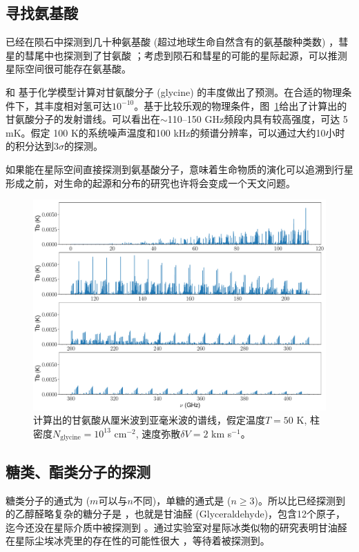 \documentclass{report}
\newcommand{\reffig}[1]{图~\ref{#1}}
\begin{document}
\subsection{寻找氨基酸}
已经在陨石中探测到几十种氨基酸 (超过地球生命自然含有的氨基酸种类数) \citep{Kvenvolden1970,Schmitt2010}，彗星的彗尾中也探测到了甘氨酸 \citep{Altwegg2016}；考虑到陨石和彗星的可能的星际起源，可以推测星际空间很可能存在氨基酸。

\citet{Garrod2013} 和 \citet{Suzuki2018}基于化学模型计算对甘氨酸分子 (glycine) 的丰度做出了预测。在合适的物理条件下，其丰度相对氢可达$10^{-10}$。基于比较乐观的物理条件，\reffig{figGlycine}给出了计算出的甘氨酸分子的发射谱线。可以看出在$\sim$110--150 GHz频段内具有较高强度，可达 5 mK。假定 100 K的系统噪声温度和100 kHz的频谱分辨率，可以通过大约10小时的积分达到$3\sigma$的探测。

如果能在星际空间直接探测到氨基酸分子，意味着生命物质的演化可以追溯到行星形成之前，对生命的起源和分布的研究也许将会变成一个天文问题。

\begin{figure}[htbp]
\centering
\includegraphics[width=0.95\linewidth]{glycine_50K_1e13_10e5_2e5.pdf}
\caption{计算出的甘氨酸从厘米波到亚毫米波的谱线，假定温度$T=50$ K, 柱密度$N_\text{glycine}=10^{13}$ cm$^{-2}$, 速度弥散$\delta V=2$ km s$^{-1}$。\label{figGlycine}}
\end{figure}

\subsection{糖类、酯类分子的探测}

糖类分子的通式为  ($m$可以与$n$不同)，单糖的通式是  ($n\ge3$)。所以比已经探测到的乙醇醛略复杂的糖分子是 ，也就是甘油醛 (Glyceraldehyde)，包含12个原子，迄今还没在星际介质中被探测到 \citep{Hollis2004}。通过实验室对星际冰类似物的研究表明甘油醛在星际尘埃冰壳里的存在性的可能性很大 \citep{deMarcellus2015}，等待着被探测到。
\end{document}

